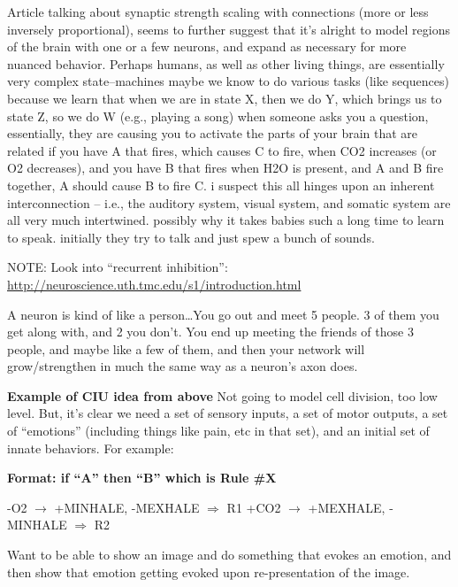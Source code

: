 \documentclass[11pt, a4paper, oneside]{article}   	%
\begin{document}
\begin{outline}
\point Article talking about synaptic strength scaling with connections (more or less inversely proportional), seems to further suggest that it's alright to model regions of the brain with one or a few neurons, and expand as necessary for more nuanced behavior.
\point Perhaps humans, as well as other living things, are essentially very complex state--machines
    \subpoint maybe we know to do various tasks (like sequences) because we learn that when we are in state X, then we do Y, which brings us to state Z, so we do W (e.g., playing a song)
\point when someone asks you a question, essentially, they are causing you to activate the parts of your brain that are related 
\point if you have A that fires, which causes C to fire, when CO2 increases (or O2 decreases), and you have B that fires when H2O is present, and A and B fire together, A should cause B to fire C.
    \subpoint i suspect this all hinges upon an inherent interconnection  -- i.e., the auditory system, visual system, and somatic system are all very much intertwined.
        \subsubpoint possibly why it takes babies such a long time to learn to speak. initially they try to talk and just spew a bunch of sounds.
\end{outline}

NOTE: Look into ``recurrent inhibition'': \url{http://neuroscience.uth.tmc.edu/s1/introduction.html}

A neuron is kind of like a person\ldots You go out and meet 5 people. 3 of them you get along with, and 2 you don't. You end up meeting the friends of those 3 people, and maybe like a few of them, and then your network will grow/strengthen in much the same way as a neuron's axon does.

\textbf{Example of CIU idea from above}
Not going to model cell division, too low level. But, it's clear we need a set of sensory inputs, a set of motor outputs, a set of ``emotions'' (including things like pain, etc in that set), and an initial set of innate behaviors. For example:

\textbf{Format: if ``A'' then ``B'' which is Rule \#X}
\begin{outline}
\point -O2 $\rightarrow$ +MINHALE, -MEXHALE $\Rightarrow$ R1
\point +CO2 $\rightarrow$ +MEXHALE, -MINHALE $\Rightarrow$ R2
\end{outline}

Want to be able to show an image and do something that evokes an emotion, and then show that emotion getting evoked upon re-presentation of the image. 
\end{document}
